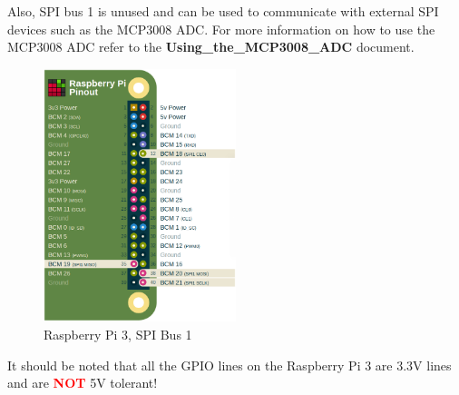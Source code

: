 \documentclass{article}
\begin{document}
Also, SPI bus 1 is unused and can be used to communicate with external SPI devices such as the MCP3008 ADC. For more information on how to use the MCP3008 ADC refer to the \textbf{Using\_the\_MCP3008\_ADC} document. \\

	\begin{figure}[H]
		\centering
		\includegraphics[width=0.5\textwidth]{pics/SPI_Bus1_CS0.png}
		\caption{Raspberry Pi 3, SPI Bus 1}
		\label{SPI_Bus1}
	\end{figure}

It should be noted that all the GPIO lines on the Raspberry Pi 3 are 3.3V lines and are \textcolor{red}{\textbf{NOT}} 5V tolerant!





	
	







\end{document}
